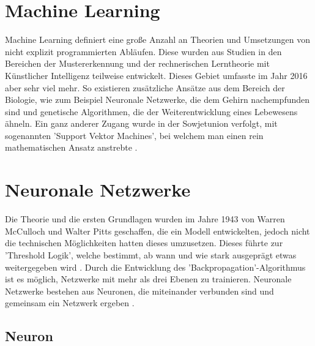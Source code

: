 \section{Machine Learning}
\label{sec:Machine Learning}

Machine Learning definiert eine große Anzahl an Theorien und Umsetzungen von nicht explizit programmierten Abläufen. 
Diese wurden aus Studien in den Bereichen der Mustererkennung und der rechnerischen Lerntheorie mit Künstlicher Intelligenz teilweise entwickelt. 
Dieses Gebiet umfasste im Jahr 2016 aber sehr viel mehr. 
So existieren zusätzliche Ansätze aus dem Bereich der Biologie, wie zum Beispiel Neuronale Netzwerke, die dem Gehirn nachempfunden sind und genetische Algorithmen, die der Weiterentwicklung eines Lebewesens ähneln. 
Ein ganz anderer Zugang wurde in der Sowjetunion verfolgt, mit sogenannten 'Support Vektor Machines', bei welchem man einen rein mathematischen Ansatz anstrebte \cite{lampropoulos2015machine}. 

\section{Neuronale Netzwerke}


Die Theorie und die ersten Grundlagen wurden im Jahre 1943 von Warren McCulloch und Walter Pitts geschaffen, die ein Modell entwickelten, jedoch nicht die technischen Möglichkeiten hatten dieses umzusetzen.
Dieses %
führte zur 'Threshold Logik', welche bestimmt, ab wann und wie stark ausgeprägt etwas weitergegeben wird \cite{rojas2013neural}.
Durch die Entwicklung des 'Backpropagation'-Algorithmus ist es möglich, Netzwerke mit mehr als drei Ebenen zu trainieren.
Neuronale Netzwerke bestehen aus Neuronen, die miteinander verbunden sind und gemeinsam ein Netzwerk ergeben \cite{AI3}.  %



\subsection{Neuron}
\label{sec:Neuron}

